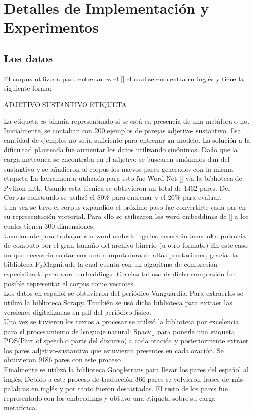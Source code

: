 \chapter{Detalles de Implementación y Experimentos}\label{chapter:implementation}
\section{Los datos}
El corpus utilizado para entrenar es el [\cite{Tsvetkov}] el cual se encuentra en inglés y tiene la siguiente forma:
\begin{center}
 ADJETIVO SUSTANTIVO ETIQUETA
\end{center}
La etiqueta es binaria representando si se está en presencia de una metáfora o no.\\
Inicialmente, se contaban con 200 ejemplos de parejas adjetivo- sustantivo. Esa cantidad de ejemplos no sería suficiente para entrenar un modelo. La solución a la dificultad planteada fue aumentar los datos utilizando sinónimos. Dado que la carga meteórica se encontraba en el adjetivo se buscaron sinónimos dan del sustantivo y se añadieron al corpus los nuevos pares generados con la misma etiqueta La herramienta utilizada para esto fue Word Net [\cite{Miller}] vía la biblioteca de Python nltk. Usando esta técnica se obtuvieron un total de 1462 pares. Del Corpus construido se utilizó el 80\% para entrenar y el 20\% para evaluar.\\
Una vez se tuvo el corpus expandido el próximo paso fue convertirte cada par en su representación vectorial. Para ello se utilizaron los word embeddings de [\cite{MikolovetAl}] a los cuales tienen 300 dimensiones.\\
Usualmente para trabajar con word embeddings les necesario tener alta potencia de computo por el gran tamaño del archivo binario (u otro formato) En este caso no que necesario contar con una computadora de altas prestaciones, gracias la biblioteca PyMagnitude la cual cuenta con un algoritmo de compresión especializado para word embeddings. Gracias tal uso de dicha compresión fue posible representar el corpus como vectores.\\
Los datos en español se obtuvieron del periódico Vanguardia. Para extraerlos se utilizó la biblioteca Scrapy. También se usó dicha biblioteca para extraer las versiones digitalizadas en pdf del periódico físico. \\
Una vez se tuvieron los textos a procesar se utilizó la biblioteca por excelencia para el procesamiento de lenguaje natural: Spacy[\cite{spacy2}] para ponerle una etiqueta POS(Part of speech o parte del discurso) a cada oración y posteriormente extraer los pares adjetivo-sustantivo que estuvieran presentes en cada oración. Se obtuvieron 9186 pares con este proceso\\
Finalmente se utilizó la biblioteca Googletrans para llevar los pares del español al inglés. Debido a este proceso de traducción 366 pares se volvieron frases de más palabras en inglés y por tanto fueron descartadas. El resto de los pares fue representado con los embeddings y obtuvo una etiqueta sobre su carga metafórica.
